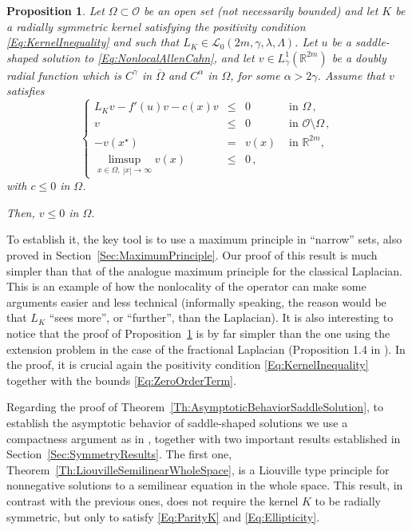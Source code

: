 \documentclass[12pt,reqno]{amsart}
\newtheorem{proposition}[theorem]{Proposition}
\theoremstyle{definition}
\theoremstyle{remark}
\newcommand{\con}[1]{\mathbb{#1}}
\newcommand{\R}{\con{R}} %
\newcommand{\lcal}{\mathcal{L}}
\newcommand{\ocal}{\mathcal{O}}
\newcommand{\s}{\gamma}
\newcommand\beqc[1]{\left\{\begin{array}{#1}}
\newcommand\eeqc{\end{array} \right.}
\def\PDEsystem{rcll}
\def\ds{\displaystyle}
\numberwithin{equation}{section}
\begin{document}
\begin{proposition}
	\label{Prop:MaximumPrincipleLinearized}
	Let $\Omega \subset \ocal$ be an open set (not necessarily bounded) and let $K$ be a radially symmetric kernel satisfying the positivity condition \eqref{Eq:KernelInequality} and such that $L_K\in \lcal_0(2m, \s, \lambda, \Lambda)$. Let $u$ be a saddle-shaped solution to \eqref{Eq:NonlocalAllenCahn}, and let $v\in  L^1_\s(\R^{2m})$ be  a doubly radial function which is $C^\s$ in $\overline{\Omega}$ and $C^\alpha$ in $\Omega$, for some $\alpha > 2\s$. Assume that $v$ satisfies
	$$
	\beqc{\PDEsystem}
	L_K v - f'(u)v - c(x)v &\leq & 0 &\textrm{ in } \Omega\,,\\
	v &\leq & 0 &\textrm{ in } \ocal \setminus \Omega\,,\\
	- v(x^\star) & = & v(x) &\textrm{ in } \R^{2m},\\
	\ds \limsup_{x\in \Omega, \ |x|\to \infty} v(x) &\leq & 0\,,
	\eeqc
	$$
	with $c\leq 0$ in $\Omega$.
	
	Then, $v \leq 0$ in $\Omega$.
\end{proposition}


To establish it, the key tool is to use a maximum principle in ``narrow'' sets, also proved in Section~\ref{Sec:MaximumPrinciple}. Our proof of this result is much simpler than that of the analogue maximum principle for the classical Laplacian. This is an example of how the nonlocality of the operator can make some arguments easier and less technical (informally speaking, the reason would be that $L_K$ ``sees more'', or ``further'', than the Laplacian). It is also interesting to notice that the proof of Proposition~\ref{Prop:MaximumPrincipleLinearized} is by far simpler than the one using the extension problem in the case of the fractional Laplacian (Proposition 1.4 in \cite{Felipe-Sanz-Perela:SaddleFractional}). In the proof, it is crucial again the positivity condition \eqref{Eq:KernelInequality} together with the bounds \eqref{Eq:ZeroOrderTerm}.

Regarding the proof of Theorem~\ref{Th:AsymptoticBehaviorSaddleSolution}, to establish the asymptotic behavior of saddle-shaped solutions we use a compactness argument as in \cite{CabreTerraII, Cinti-Saddle, Cinti-Saddle2}, together with two important results established in Section~\ref{Sec:SymmetryResults}. The first one, Theorem~\ref{Th:LiouvilleSemilinearWholeSpace}, is a Liouville type principle for nonnegative solutions to a semilinear equation in the whole space. This result, in contrast with the previous ones, does not require the kernel $K$ to be radially symmetric, but only to satisfy \eqref{Eq:ParityK} and \eqref{Eq:Ellipticity}.
\end{document}

